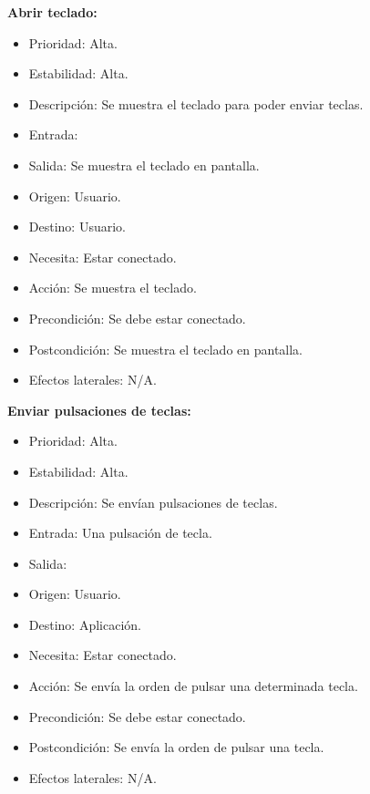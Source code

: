 \textbf{Abrir teclado:}
\begin{itemize}
\item Prioridad: Alta.
\item Estabilidad: Alta.
\item Descripción: Se muestra el teclado para poder enviar teclas.
\item Entrada:
\item Salida: Se muestra el teclado en pantalla.
\item Origen: Usuario.
\item Destino: Usuario.
\item Necesita: Estar conectado.
\item Acción: Se muestra el teclado.
\item Precondición: Se debe estar conectado.
\item Postcondición: Se muestra el teclado en pantalla.
\item Efectos laterales: N/A.\\

\end{itemize}
\newpage
\textbf{Enviar pulsaciones de teclas:}
\begin{itemize}
\item Prioridad: Alta.
\item Estabilidad: Alta.
\item Descripción: Se envían pulsaciones de teclas.
\item Entrada: Una pulsación de tecla.
\item Salida:
\item Origen: Usuario.
\item Destino: Aplicación.
\item Necesita: Estar conectado.
\item Acción: Se envía la orden de pulsar una determinada tecla.
\item Precondición: Se debe estar conectado.
\item Postcondición: Se envía la orden de pulsar una tecla.
\item Efectos laterales: N/A.\\

\end{itemize}

